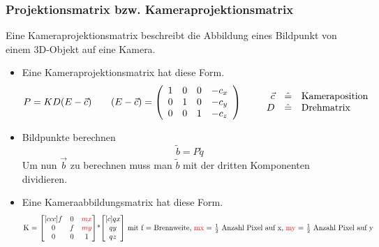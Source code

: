 	\subsubsection{Projektionsmatrix bzw. Kameraprojektionsmatrix}
		Eine Kameraprojektionsmatrix beschreibt die Abbildung eines Bildpunkt von einem 3D-Objekt auf eine Kamera.		
		\begin{itemize}
			\item Eine Kameraprojektionsmatrix hat diese Form.
				\begin{equation*}
				P = KD (E - \vec{c})
				\qquad
				(E-\vec{c})=\left(\begin{array}{cccc}
				1 & 0 & 0 &-c_x\\
				0 & 1 & 0 &-c_y\\
				0 & 0 & 1 &-c_z
				\end{array}\right)
				\qquad
					\begin{array}{rcl}
						\vec{c} & \hat{=} & $Kameraposition$\\
						D & \hat{=} & $Drehmatrix$
					\end{array}
				\end{equation*}
			\item Bildpunkte berechnen
				\begin{equation*}
					\tilde{b} = P \tilde{q}
				\end{equation*}
				Um nun $\vec{b}$ zu berechnen muss man $\tilde{b}$ mit der dritten Komponenten dividieren.
			
			\item Eine Kameraabbildungsmatrix hat diese Form.
				\begin{equation*}
					$K = $
					\begin{bmatrix}[ccc]
						f	&	0	&	\color{red} mx	\\
						0 	&	f	&	\color{red} my	\\
						0	&	0	&	1
					
					\end{bmatrix}
					$*$
					\begin{bmatrix}[c]
						qx	\\
						qy 	\\
						qz	
					
					\end{bmatrix}
					$$
					\text{ mit}
					$$
						\text{ f = Brennweite, \color{red} mx \color{black} = $\frac{1}{2}$ Anzahl Pixel auf x, \color{red} my \color{black} = $\frac{1}{2}$ Anzahl Pixel auf y}
					$$
				\end{equation*}
				

\end{itemize}
